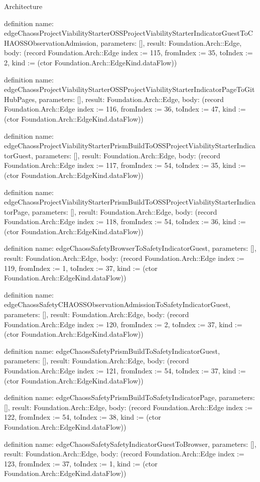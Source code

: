 \begin{lexlean}{Architecture}
\begin{semanticmodule}
definition{
  name: edgeChaossProjectViabilityStarterOSSProjectViabilityStarterIndicatorGuestToCHAOSSObservationAdmission,
  parameters: [],
  result: Foundation.Arch::Edge,
  body: (record Foundation.Arch::Edge {index := 115, fromIndex := 35, toIndex := 2, kind := (ctor Foundation.Arch::EdgeKind.dataFlow)})
}

definition{
  name: edgeChaossProjectViabilityStarterOSSProjectViabilityStarterIndicatorPageToGitHubPages,
  parameters: [],
  result: Foundation.Arch::Edge,
  body: (record Foundation.Arch::Edge {index := 116, fromIndex := 36, toIndex := 47, kind := (ctor Foundation.Arch::EdgeKind.dataFlow)})
}

definition{
  name: edgeChaossProjectViabilityStarterPrismBuildToOSSProjectViabilityStarterIndicatorGuest,
  parameters: [],
  result: Foundation.Arch::Edge,
  body: (record Foundation.Arch::Edge {index := 117, fromIndex := 54, toIndex := 35, kind := (ctor Foundation.Arch::EdgeKind.dataFlow)})
}

definition{
  name: edgeChaossProjectViabilityStarterPrismBuildToOSSProjectViabilityStarterIndicatorPage,
  parameters: [],
  result: Foundation.Arch::Edge,
  body: (record Foundation.Arch::Edge {index := 118, fromIndex := 54, toIndex := 36, kind := (ctor Foundation.Arch::EdgeKind.dataFlow)})
}

definition{
  name: edgeChaossSafetyBrowserToSafetyIndicatorGuest,
  parameters: [],
  result: Foundation.Arch::Edge,
  body: (record Foundation.Arch::Edge {index := 119, fromIndex := 1, toIndex := 37, kind := (ctor Foundation.Arch::EdgeKind.dataFlow)})
}

definition{
  name: edgeChaossSafetyCHAOSSObservationAdmissionToSafetyIndicatorGuest,
  parameters: [],
  result: Foundation.Arch::Edge,
  body: (record Foundation.Arch::Edge {index := 120, fromIndex := 2, toIndex := 37, kind := (ctor Foundation.Arch::EdgeKind.dataFlow)})
}

definition{
  name: edgeChaossSafetyPrismBuildToSafetyIndicatorGuest,
  parameters: [],
  result: Foundation.Arch::Edge,
  body: (record Foundation.Arch::Edge {index := 121, fromIndex := 54, toIndex := 37, kind := (ctor Foundation.Arch::EdgeKind.dataFlow)})
}

definition{
  name: edgeChaossSafetyPrismBuildToSafetyIndicatorPage,
  parameters: [],
  result: Foundation.Arch::Edge,
  body: (record Foundation.Arch::Edge {index := 122, fromIndex := 54, toIndex := 38, kind := (ctor Foundation.Arch::EdgeKind.dataFlow)})
}

definition{
  name: edgeChaossSafetySafetyIndicatorGuestToBrowser,
  parameters: [],
  result: Foundation.Arch::Edge,
  body: (record Foundation.Arch::Edge {index := 123, fromIndex := 37, toIndex := 1, kind := (ctor Foundation.Arch::EdgeKind.dataFlow)})
}


\end{semanticmodule}
\end{lexlean}

